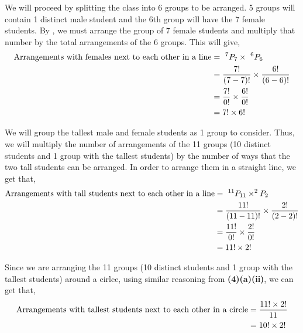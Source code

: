 \begin{subquestions}
\begin{subsubquestions}
We will proceed by splitting the class into 6 groups to be arranged. 5 groups will contain 1 distinct male student and the 6th group will have the 7 female students. By , we must arrange the group of 7 female students and multiply that number by the total arrangements of the 6 groups. This will give,
\begin{align}
	\text{Arrangements with females next to each other in a line} & = ~^7P_7 \times ~^6P_6 \nonumber \\
	                                            & = \frac{7!}{(7-7)!} \times \frac{6!}{(6-6)!} \nonumber \\
	                                            & = \frac{7!}{0!} \times \frac{6!}{0!} \nonumber \\
	                                            & = 7! \times 6! 
\end{align}


\subsubquestion

We will group the tallest male and female students as 1 group to consider. Thus, we will multiply the number of arrangements of the 11 groups (10 distinct students and 1 group with the tallest students) by the number of ways that the two tall students can be arranged. In order to arrange them in a straight line, we get that,
\begin{align}
	\text{Arrangements with tall students next to each other in a line} & = ~^{11}P_{11} \times ^{2}P_{2} \nonumber \\
	                                            & = \frac{11!}{(11-11)!} \times \frac{2!}{(2-2)!} \nonumber \\
	                                            & = \frac{11!}{0!} \times \frac{2!}{0!} \nonumber \\
	                                            & = 11! \times 2!
\end{align}

Since we are arranging the 11 groups (10 distinct students and 1 group with the tallest students) around a cirlce, using similar reasoning from \textbf{(4)(a)(ii)}, we can get that,
\begin{align}
	\text{Arrangements with tallest students next to each other in a circle} & = \frac{11! \times 2!}{11} \nonumber \\
																			 & = 10! \times 2! 
\end{align}


\end{subsubquestions}
\end{subquestions}
